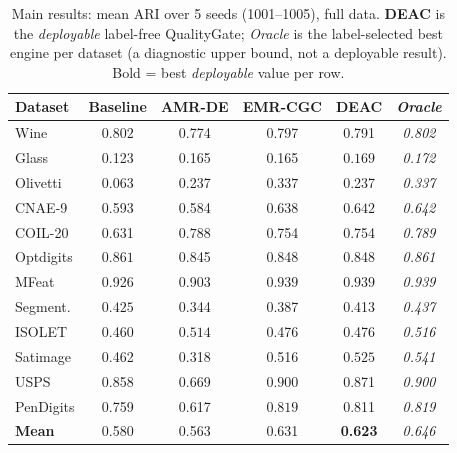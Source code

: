 \begin{table}[!t]
\centering
\caption{Main results: mean ARI over 5 seeds (1001--1005), full data. \textbf{DEAC} is the \emph{deployable} label-free QualityGate; \emph{Oracle} is the label-selected best engine per dataset (a diagnostic upper bound, not a deployable result). Bold = best \emph{deployable} value per row.}
\label{tab:main_results}
\footnotesize
\setlength{\tabcolsep}{4pt}
\begin{tabular}{lccccc}
\toprule
Dataset & Baseline & AMR-DE & EMR-CGC & \textbf{DEAC} & \textit{Oracle} \\
\midrule
Wine & $\mathbf{0.802}$ & 0.774 & 0.797 & 0.791 & \textit{0.802} \\
Glass & 0.123 & 0.165 & 0.165 & $\mathbf{0.169}$ & \textit{0.172} \\
Olivetti & 0.063 & 0.237 & $\mathbf{0.337}$ & 0.237 & \textit{0.337} \\
CNAE-9 & 0.593 & 0.584 & 0.638 & $\mathbf{0.642}$ & \textit{0.642} \\
COIL-20 & 0.631 & $\mathbf{0.788}$ & 0.754 & 0.754 & \textit{0.789} \\
Optdigits & $\mathbf{0.861}$ & 0.845 & 0.848 & 0.848 & \textit{0.861} \\
MFeat & 0.926 & 0.903 & $\mathbf{0.939}$ & $\mathbf{0.939}$ & \textit{0.939} \\
Segment. & $\mathbf{0.425}$ & 0.344 & 0.387 & 0.413 & \textit{0.437} \\
ISOLET & 0.460 & $\mathbf{0.514}$ & 0.476 & 0.476 & \textit{0.516} \\
Satimage & 0.462 & 0.318 & 0.516 & $\mathbf{0.525}$ & \textit{0.541} \\
USPS & 0.858 & 0.669 & $\mathbf{0.900}$ & 0.871 & \textit{0.900} \\
PenDigits & 0.759 & 0.617 & $\mathbf{0.819}$ & 0.811 & \textit{0.819} \\
\midrule
\textbf{Mean} & 0.580 & 0.563 & 0.631 & \textbf{0.623} & \textit{0.646} \\
\bottomrule
\end{tabular}
\end{table}
